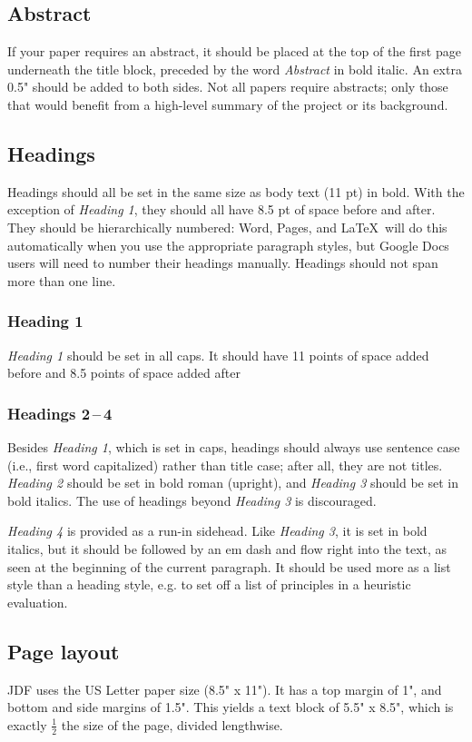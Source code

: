 \documentclass[
	letterpaper, %
]{jdf}
\begin{document}
\begin{Abstract}
\subsection{Abstract}
If your paper requires an abstract, it should be placed at the top of the first page underneath the title block, preceded by the word \emph{Abstract} in bold italic. An extra 0.5" should be added to both sides. Not all papers require abstracts; only those that would benefit from a high-level summary of the project or its background.

\subsection{Headings}
Headings should all be set in the same size as body text (11 pt) in bold. With the exception of \emph{Heading 1}, they should all have 8.5 pt of space before and after. They should be hierarchically numbered: Word, Pages, and \LaTeX\ will do this automatically when you use the appropriate paragraph styles, but Google Docs users will need to number their headings manually. Headings should not span more than one line.

\subsubsection{Heading 1}
\emph{Heading 1} should be set in all caps. It should have 11 points of space added before and 8.5 points of space added after

\subsubsection{Headings 2\,–\,4}
Besides \emph{Heading 1}, which is set in caps, headings should always use sentence case (i.e., first word capitalized) rather than title case; after all, they are not titles. \emph{Heading 2} should be set in bold roman (upright), and \emph{Heading 3} should be set in bold italics. The use of headings beyond \emph{Heading 3} is discouraged.

\emph{Heading 4} is provided as a run-in sidehead. Like \emph{Heading 3}, it is set in bold italics, but it should be followed by an em dash and flow right into the text, as seen at the beginning of the current paragraph. It should be used more as a list style than a heading style, e.g. to set off a list of principles in a heuristic evaluation.

\subsection{Page layout}
JDF uses the US Letter paper size (8.5" x 11"). It has a top margin of 1", and bottom and side margins of 1.5". This yields a text block of 5.5" x 8.5", which is exactly \(\frac{1}{2}\) the size of the page, divided lengthwise.


\end{Abstract}
\end{document}
